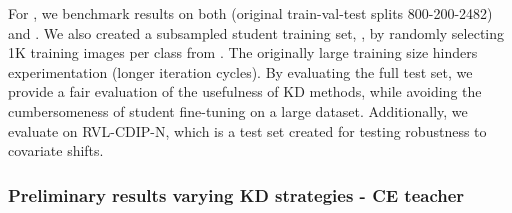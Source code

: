 For \DC{}, we benchmark results on both \tobacco{} (original train-val-test splits 800-200-2482) and \rvl.  
We also created a subsampled student training set, \rvlone, by randomly selecting 1K training images per class from \rvl. The originally large training size hinders experimentation (longer iteration cycles).
By evaluating the full \rvl{} test set, we provide a fair evaluation of the usefulness of KD methods, while avoiding the cumbersomeness of student fine-tuning on a large dataset. Additionally, we evaluate on RVL-CDIP-N, which is a test set created for testing robustness to covariate shifts.




\subsubsection{Preliminary results varying KD strategies - CE teacher}

